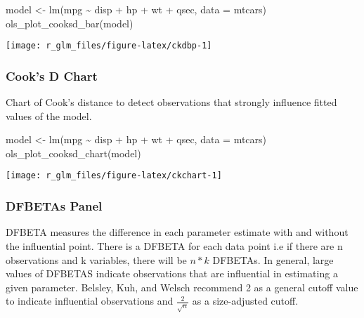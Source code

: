 \documentclass[
]{article}
\newenvironment{Shaded}{\begin{snugshade}}{\end{snugshade}}
\newcommand{\AttributeTok}[1]{\textcolor[rgb]{0.77,0.63,0.00}{#1}}
\newcommand{\FunctionTok}[1]{\textcolor[rgb]{0.00,0.00,0.00}{#1}}
\newcommand{\NormalTok}[1]{#1}
\newcommand{\OtherTok}[1]{\textcolor[rgb]{0.56,0.35,0.01}{#1}}
\newcommand{\SpecialCharTok}[1]{\textcolor[rgb]{0.00,0.00,0.00}{#1}}
\begin{document}
\begin{Shaded}
\begin{Highlighting}[]
\NormalTok{model }\OtherTok{\textless{}{-}} \FunctionTok{lm}\NormalTok{(mpg }\SpecialCharTok{\textasciitilde{}}\NormalTok{ disp }\SpecialCharTok{+}\NormalTok{ hp }\SpecialCharTok{+}\NormalTok{ wt }\SpecialCharTok{+}\NormalTok{ qsec, }\AttributeTok{data =}\NormalTok{ mtcars)}
\FunctionTok{ols\_plot\_cooksd\_bar}\NormalTok{(model)}
\end{Highlighting}
\end{Shaded}

\begin{center}\texttt{[image: r\_glm\_files/figure-latex/ckdbp-1]} \end{center}

\hypertarget{cooks-d-chart}{%
\subsubsection{Cook's D Chart}\label{cooks-d-chart}}

Chart of Cook's distance to detect observations that strongly influence
fitted values of the model.

\begin{Shaded}
\begin{Highlighting}[]
\NormalTok{model }\OtherTok{\textless{}{-}} \FunctionTok{lm}\NormalTok{(mpg }\SpecialCharTok{\textasciitilde{}}\NormalTok{ disp }\SpecialCharTok{+}\NormalTok{ hp }\SpecialCharTok{+}\NormalTok{ wt }\SpecialCharTok{+}\NormalTok{ qsec, }\AttributeTok{data =}\NormalTok{ mtcars)}
\FunctionTok{ols\_plot\_cooksd\_chart}\NormalTok{(model)}
\end{Highlighting}
\end{Shaded}

\begin{center}\texttt{[image: r\_glm\_files/figure-latex/ckchart-1]} \end{center}

\hypertarget{dfbetas-panel}{%
\subsubsection{DFBETAs Panel}\label{dfbetas-panel}}

DFBETA measures the difference in each parameter estimate with and
without the influential point. There is a DFBETA for each data point i.e
if there are n observations and k variables, there will be \(n * k\)
DFBETAs. In general, large values of DFBETAS indicate observations that
are influential in estimating a given parameter. Belsley, Kuh, and
Welsch recommend 2 as a general cutoff value to indicate influential
observations and \(\frac{2}{\sqrt{n}}\) as a size-adjusted cutoff.
\end{document}
